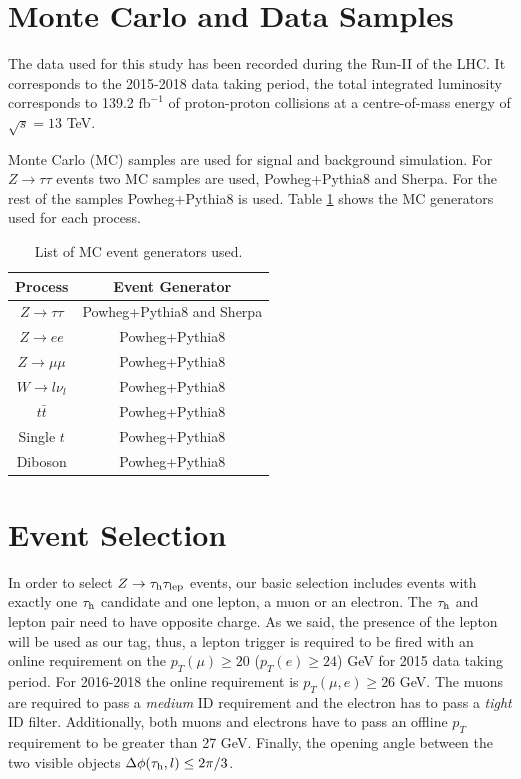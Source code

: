 \section{Monte Carlo and Data Samples}
The data used for this study has been recorded during the Run-II of the LHC. It corresponds to the 2015-2018 data taking period, the total integrated luminosity corresponds to 139.2 $\text{fb}^{-1}$ of proton-proton collisions at a centre-of-mass energy of $\sqrt{s}=13$ TeV.

Monte Carlo (MC) samples are used for signal and background simulation. For $Z\to\tau\tau$ events two MC samples are used, Powheg+Pythia8 and Sherpa. For the rest of the samples Powheg+Pythia8 is used. Table \ref{Table3} shows the MC generators used for each process.

\begin{table}[]
	\centering
	\begin{tabular}{cc}
		\hline
		\multicolumn{1}{|c|}{Process}  & \multicolumn{1}{c|}{Event Generator} \\ \hline
		$Z\to\tau\tau$                 & Powheg+Pythia8 and Sherpa            \\
		$Z\to ee$                      & Powheg+Pythia8                       \\
		$Z\to\mu\mu$                   & Powheg+Pythia8                       \\
		$W\to l\nu_l$				   & Powheg+Pythia8                       \\
		$t\bar{t}$                     & Powheg+Pythia8                       \\
		Single $t$                     & Powheg+Pythia8                       \\
		Diboson                        & Powheg+Pythia8                       \\ \hline
	\end{tabular}
	\caption{List of MC event generators used.}
	\label{Table3}
\end{table}
\section{Event Selection}\label{chap4sec3}
In order to select $Z\to\tau_\text{h}\tau_\text{lep}$ events, our basic selection includes events with exactly one $\tau_\text{h}$ candidate and one lepton, a muon or an electron. The $\tau_\text{h}$ and lepton pair need to have opposite charge. As we said, the presence of the lepton will be used as our tag, thus, a lepton trigger is required to be fired with an online requirement on the $p_{T}(\mu)\geq 20$ ($p_{T}(e)\geq 24$) GeV for 2015 data taking period. For 2016-2018 the online requirement is $p_{T}(\mu,e)\geq 26$ GeV. The muons are required to pass a \textit{medium} ID requirement and the electron has to pass a \textit{tight} ID filter. Additionally, both muons and electrons have to pass an offline $p_T$ requirement to be greater than 27 GeV. Finally, the opening angle between the two visible objects $\Delta\phi(\tau_\text{h},l)\leq 2\pi/3$.

